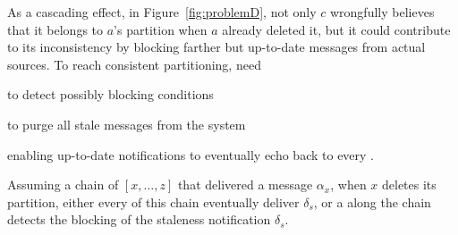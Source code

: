 As a cascading effect, in Figure~\ref{fig:problemD}, not only $c$
wrongfully believes that it belongs to $a$'s partition when $a$
already deleted it, but it could contribute to its inconsistency by
blocking farther but up-to-date messages from actual sources. To reach
consistent partitioning, \processes need
\begin{inparaenum}[(i)]
\item to detect possibly blocking conditions 
\item to purge all stale messages from the system
\item enabling up-to-date notifications to eventually echo back to
  every \process.
\end{inparaenum}

\begin{lemma}
  Assuming a chain of \processes $[x,\ldots, z]$ that delivered a
  message $\alpha_x$, when $x$ deletes its partition, either every
  \process of this chain eventually deliver $\delta_s$, or a \process
  along the chain detects the blocking of the staleness notification
  $\delta_s$.
\end{lemma}


